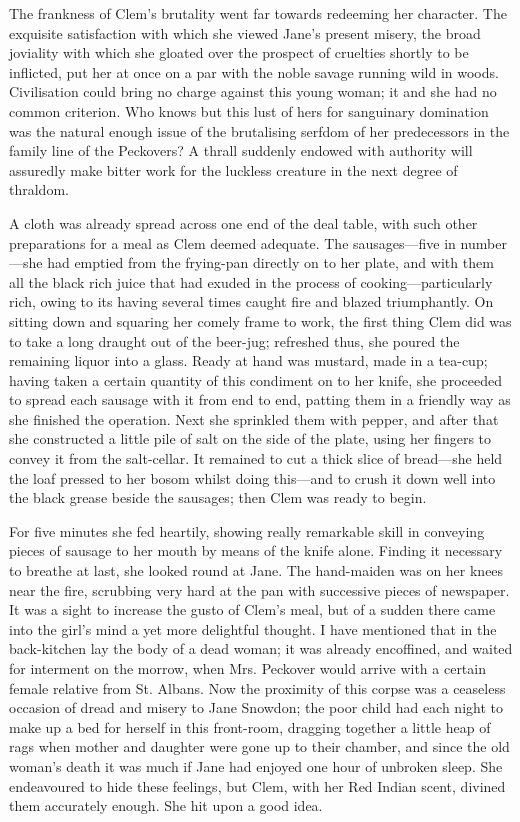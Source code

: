 The frankness of Clem's brutality went far towards redeeming her
character. The exquisite satisfaction with which she viewed Jane's
present misery, the broad joviality with which she gloated over the
prospect of cruelties shortly to be inflicted, put her at once on a par
with the noble savage running wild in woods. Civilisation could bring no
charge against this young woman; it and she had no common criterion. Who
knows but this lust of hers for sanguinary domination was the natural
enough issue of the brutalising serfdom of her predecessors in the
family line of the Peckovers? A thrall suddenly endowed with authority
will assuredly make bitter work for the luckless creature in the next
degree of thraldom.

A cloth was already spread across one end of the deal table, with such
other {}preparations for a meal as Clem deemed adequate. The
sausages---five in number---she had emptied from the frying-pan directly
on to her plate, and with them all the black rich juice that had exuded
in the process of cooking---particularly rich, owing to its having
several times caught fire and blazed triumphantly. On sitting down and
squaring her comely frame to work, the first thing Clem did was to take
a long draught out of the beer-jug; refreshed thus, she poured the
remaining liquor into a glass. Ready at hand was mustard, made in a
tea-cup; having taken a certain quantity of this condiment on to her
knife, she proceeded to spread each sausage with it from end to end,
patting them in a friendly way as she finished the operation. Next she
sprinkled them with pepper, and after that she constructed a little pile
of salt on the side of the plate, using her fingers to convey it from
the salt-cellar. It remained to cut a thick slice of bread---she held
the loaf pressed to her bosom whilst doing this---and {}to crush it down
well into the black grease beside the sausages; then Clem was ready to
begin.

For five minutes she fed heartily, showing really remarkable skill in
conveying pieces of sausage to her mouth by means of the knife alone.
Finding it necessary to breathe at last, she looked round at Jane. The
hand-maiden was on her knees near the fire, scrubbing very hard at the
pan with successive pieces of newspaper. It was a sight to increase the
gusto of Clem's meal, but of a sudden there came into the girl's mind a
yet more delightful thought. I have mentioned that in the back-kitchen
lay the body of a dead woman; it was already encoffined, and waited for
interment on the morrow, when Mrs. Peckover would arrive with a certain
female relative from St. Albans. Now the proximity of this corpse was a
ceaseless occasion of dread and misery to Jane Snowdon; the poor child
had each night to make up a bed for herself in this front-room, dragging
together a little heap of rags when {}mother and daughter were gone up
to their chamber, and since the old woman's death it was much if Jane
had enjoyed one hour of unbroken sleep. She endeavoured to hide these
feelings, but Clem, with her Red Indian scent, divined them accurately
enough. She hit upon a good idea.

